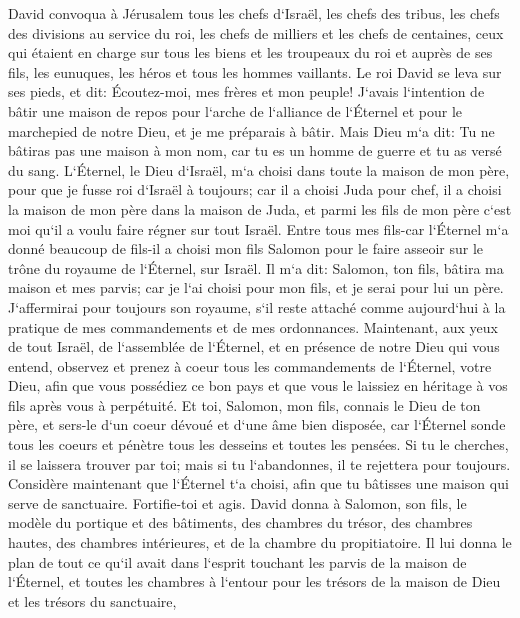 \verse David convoqua à Jérusalem tous les chefs d`Israël, les chefs des tribus, les chefs des divisions au service du roi, les chefs de milliers et les chefs de centaines, ceux qui étaient en charge sur tous les biens et les troupeaux du roi et auprès de ses fils, les eunuques, les héros et tous les hommes vaillants. 
\verse Le roi David se leva sur ses pieds, et dit: Écoutez-moi, mes frères et mon peuple! J`avais l`intention de bâtir une maison de repos pour l`arche de l`alliance de l`Éternel et pour le marchepied de notre Dieu, et je me préparais à bâtir. 
\verse Mais Dieu m`a dit: Tu ne bâtiras pas une maison à mon nom, car tu es un homme de guerre et tu as versé du sang. 
\verse L`Éternel, le Dieu d`Israël, m`a choisi dans toute la maison de mon père, pour que je fusse roi d`Israël à toujours; car il a choisi Juda pour chef, il a choisi la maison de mon père dans la maison de Juda, et parmi les fils de mon père c`est moi qu`il a voulu faire régner sur tout Israël. 
\verse Entre tous mes fils-car l`Éternel m`a donné beaucoup de fils-il a choisi mon fils Salomon pour le faire asseoir sur le trône du royaume de l`Éternel, sur Israël. 
\verse Il m`a dit: Salomon, ton fils, bâtira ma maison et mes parvis; car je l`ai choisi pour mon fils, et je serai pour lui un père. 
\verse J`affermirai pour toujours son royaume, s`il reste attaché comme aujourd`hui à la pratique de mes commandements et de mes ordonnances. 
\verse Maintenant, aux yeux de tout Israël, de l`assemblée de l`Éternel, et en présence de notre Dieu qui vous entend, observez et prenez à coeur tous les commandements de l`Éternel, votre Dieu, afin que vous possédiez ce bon pays et que vous le laissiez en héritage à vos fils après vous à perpétuité. 
\verse Et toi, Salomon, mon fils, connais le Dieu de ton père, et sers-le d`un coeur dévoué et d`une âme bien disposée, car l`Éternel sonde tous les coeurs et pénètre tous les desseins et toutes les pensées. Si tu le cherches, il se laissera trouver par toi; mais si tu l`abandonnes, il te rejettera pour toujours. 
\verse Considère maintenant que l`Éternel t`a choisi, afin que tu bâtisses une maison qui serve de sanctuaire. Fortifie-toi et agis. 
\verse David donna à Salomon, son fils, le modèle du portique et des bâtiments, des chambres du trésor, des chambres hautes, des chambres intérieures, et de la chambre du propitiatoire. 
\verse Il lui donna le plan de tout ce qu`il avait dans l`esprit touchant les parvis de la maison de l`Éternel, et toutes les chambres à l`entour pour les trésors de la maison de Dieu et les trésors du sanctuaire, 
